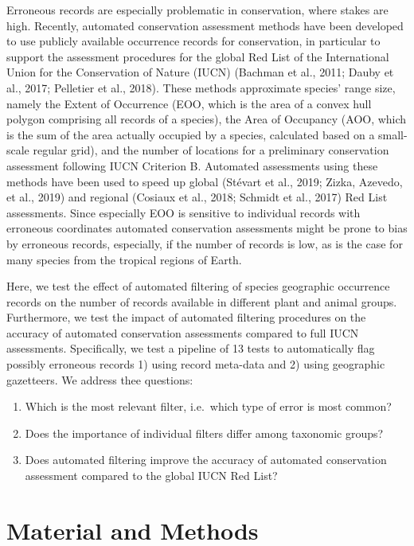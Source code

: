 \documentclass[
  12pt,
]{article}
\providecommand{\tightlist}{%
  \setlength{\itemsep}{0pt}\setlength{\parskip}{0pt}}
\begin{document}
Erroneous records are especially problematic in conservation, where stakes are high. Recently, automated conservation assessment methods have been developed to use publicly available occurrence records for conservation, in particular to support the assessment procedures for the global Red List of the International Union for the Conservation of Nature (IUCN) (Bachman et al., 2011; Dauby et al., 2017; Pelletier et al., 2018). These methods approximate species' range size, namely the Extent of Occurrence (EOO, which is the area of a convex hull polygon comprising all records of a species), the Area of Occupancy (AOO, which is the sum of the area actually occupied by a species, calculated based on a small-scale regular grid), and the number of locations for a preliminary conservation assessment following IUCN Criterion B. Automated assessments using these methods have been used to speed up global (Stévart et al., 2019; Zizka, Azevedo, et al., 2019) and regional (Cosiaux et al., 2018; Schmidt et al., 2017) Red List assessments. Since especially EOO is sensitive to individual records with erroneous coordinates automated conservation assessments might be prone to bias by erroneous records, especially, if the number of records is low, as is the case for many species from the tropical regions of Earth.

Here, we test the effect of automated filtering of species geographic occurrence records on the number of records available in different plant and animal groups. Furthermore, we test the impact of automated filtering procedures on the accuracy of automated conservation assessments compared to full IUCN assessments. Specifically, we test a pipeline of 13 tests to automatically flag possibly erroneous records 1) using record meta-data and 2) using geographic gazetteers. We address thee questions:

\begin{enumerate}
\def\labelenumi{\arabic{enumi}.}
\tightlist
\item
  Which is the most relevant filter, i.e.~which type of error is most common?
\item
  Does the importance of individual filters differ among taxonomic groups?
\item
  Does automated filtering improve the accuracy of automated conservation assessment compared to the global IUCN Red List?
\end{enumerate}

\hypertarget{material-and-methods}{%
\section{Material and Methods}\label{material-and-methods}}
\end{document}
